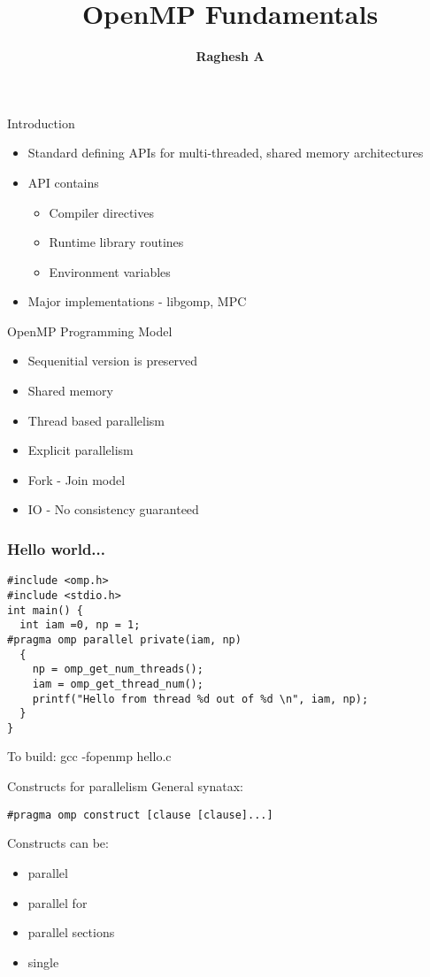\documentclass[10pt]{beamer}
\title{OpenMP Fundamentals}
\author{\textbf{Raghesh A}}
\date
\begin{document}
\begin{frame}
\titlepage
\end{frame}

\begin{frame}{Introduction}
\begin{itemize}
\item Standard defining APIs for multi-threaded, shared memory architectures
\item API contains
  \begin{itemize}
  \item Compiler directives
  \item Runtime library routines
  \item Environment variables
  \end{itemize}
\item Major implementations - libgomp, MPC
\end{itemize}
\end{frame}

\begin{frame}{OpenMP Programming Model}
\begin{itemize}
\item Sequenitial version is preserved
\item Shared memory
\item Thread based parallelism
\item Explicit parallelism
\item Fork - Join model
\item IO - No consistency guaranteed
\end{itemize}
\end{frame}

\begin{frame}[fragile]
\frametitle{Hello world...}
\begin{Verbatim}[formatcom=\color{red}]
#include <omp.h>
#include <stdio.h>
int main() {        
  int iam =0, np = 1;
#pragma omp parallel private(iam, np)
  {
    np = omp_get_num_threads();
    iam = omp_get_thread_num();
    printf("Hello from thread %d out of %d \n", iam, np);
  }
}
\end{Verbatim}
To build: gcc -fopenmp hello.c
\end{frame}

\begin{frame}[fragile]{Constructs for parallelism}
General synatax:
\begin{Verbatim}
#pragma omp construct [clause [clause]...]
\end{Verbatim}
Constructs can be:
\begin{itemize}
\item parallel
\item parallel for
\item parallel sections
\item single
\end{itemize}
\end{frame}
\end{document}
